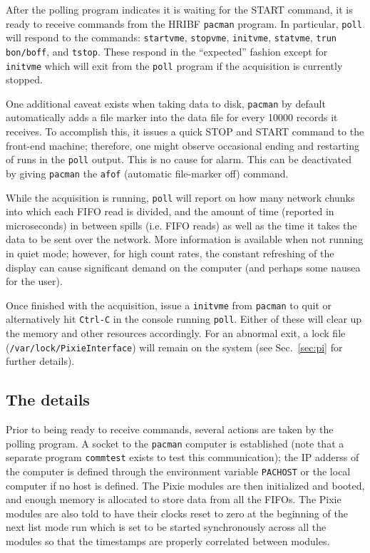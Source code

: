 \documentclass[10pt]{article}
\begin{document}
After the polling program indicates it is waiting for the \textsc{START} command, it is ready to receive commands from the HRIBF \texttt{pacman} program. In particular, \texttt{poll} will respond to the commands: \texttt{startvme}, \texttt{stopvme}, \texttt{initvme}, \texttt{statvme}, \texttt{trun bon/boff}, and \texttt{tstop}. These respond in the ``expected'' fashion except for \texttt{initvme} which will exit from the \texttt{poll} program if the acquisition is currently stopped.

One additional caveat exists when taking data to disk, \texttt{pacman} by
default automatically adds a file marker into the data file for every 10000
records it receives. To accomplish this, it issues a quick \textsc{STOP} and
\textsc{START} command to the front-end machine; therefore, one might observe
occasional ending and restarting of runs in the \texttt{poll} output. This is
no cause for alarm. This can be deactivated by giving \texttt{pacman} the
\texttt{afof} (automatic file-marker off) command.

While the acquisition is running, \texttt{poll} will report on how many network chunks into which each FIFO read is divided, and the amount of time (reported in microseconds) in between spills (i.e. FIFO reads) as well as the time it takes the data to be sent over the network. More information is available when not running in quiet mode; however, for high count rates, the constant refreshing of the display can cause significant demand on the computer (and perhaps some nausea for the user). 

Once finished with the acquisition, issue a \texttt{initvme} from \texttt{pacman} to quit or alternatively hit \texttt{Ctrl-C} in the console running \texttt{poll}. Either of these will clear up the memory and other resources accordingly. For an abnormal exit, a lock file (\texttt{/var/lock/PixieInterface}) will remain on the system (see Sec.~\ref{sec:pi} for further details).
\subsection{The details}
Prior to being ready to receive commands, several actions are taken by the
polling program. A socket to the \texttt{pacman} computer is established (note
that a separate program \texttt{commtest} exists to test this communication);
the IP adderss of the computer is defined through the environment variable
\texttt{PACHOST} or the local computer if no host is defined. The Pixie modules are then initialized and booted, and enough memory is allocated to store data from all the FIFOs. The Pixie modules are also told to have their clocks reset to zero at the beginning of the next list mode run which is set to be started synchronously across all the modules so that the timestamps are properly correlated between modules.
\end{document}
